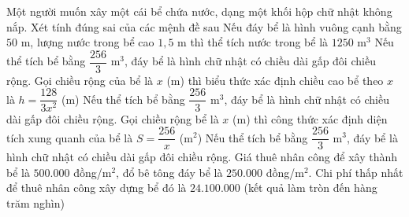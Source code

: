 \begin{ex}%
Một người muốn xây một cái bể chứa nước, dạng một khối hộp chữ nhật không nắp. Xét tính đúng sai của các mệnh đề sau
\choiceTF
{Nếu đáy bể là hình vuông cạnh bằng $50$ m, lượng nước trong bể cao $1{,}5$ m thì thể tích nước trong bể là $1250$ m$^3$}
{\True Nếu thể tích bể bằng $\dfrac{256}{3}$ m$^3$, đáy bể là hình chữ nhật có chiều dài gấp đôi chiều rộng. Gọi chiều rộng của bể là $x$ (m) thì biểu thức xác định chiều cao bể theo $x$ là $h=\dfrac{128}{3x^2}$ (m)}
{\True Nếu thể tích bể bằng $\dfrac{256}{3}$ m$^3$, đáy bể là hình chữ nhật có chiều dài gấp đôi chiều rộng. Gọi chiều rộng bể là $x$ (m) thì công thức xác định diện tích xung quanh của bể là $S=\dfrac{256}{x}$ (m$^2$)}
{Nếu thể tích bể bằng $\dfrac{256}{3}$ m$^3$, đáy bể là hình chữ nhật có chiều dài gấp đôi chiều rộng. Giá thuê nhân công để xây thành bể là $500.000$ đồng/m$^2$, đổ bê tông đáy bể là $250.000$ đồng/m$^2$. Chi phí thấp nhất để thuê nhân công xây dựng bể đó là $24.100.000$ (kết quả làm tròn đến hàng trăm nghìn)}
\end{ex}

